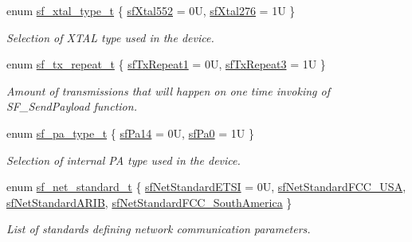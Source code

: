 \begin{DoxyCompactItemize}
enum \mbox{\hyperlink{group__sf__enum__group_ga921cd8c6964917cde98f2a132c5548d5}{sf\+\_\+xtal\+\_\+type\+\_\+t}} \{ \mbox{\hyperlink{group__sf__enum__group_gga921cd8c6964917cde98f2a132c5548d5aeec2c76936f143f22966c4e0fc3cf417}{sf\+Xtal552}} = 0U, 
\mbox{\hyperlink{group__sf__enum__group_gga921cd8c6964917cde98f2a132c5548d5a5e6adb116a9a9946e482b94bef60f46b}{sf\+Xtal276}} = 1U
 \}
\begin{DoxyCompactList}\small\item\em Selection of X\+T\+AL type used in the device. \end{DoxyCompactList}\item 
enum \mbox{\hyperlink{group__sf__enum__group_ga7d2f06984784542a95d02e422a42d9cf}{sf\+\_\+tx\+\_\+repeat\+\_\+t}} \{ \mbox{\hyperlink{group__sf__enum__group_gga7d2f06984784542a95d02e422a42d9cfa68731d8416f50490cb067b1a5fac8c49}{sf\+Tx\+Repeat1}} = 0U, 
\mbox{\hyperlink{group__sf__enum__group_gga7d2f06984784542a95d02e422a42d9cfa4da7c9c47dc49a65d23bdea3ab13ace1}{sf\+Tx\+Repeat3}} = 1U
 \}
\begin{DoxyCompactList}\small\item\em Amount of transmissions that will happen on one time invoking of S\+F\+\_\+\+Send\+Payload function. \end{DoxyCompactList}\item 
enum \mbox{\hyperlink{group__sf__enum__group_gac746e971077ef8c8dac9d26a8b47a2f9}{sf\+\_\+pa\+\_\+type\+\_\+t}} \{ \mbox{\hyperlink{group__sf__enum__group_ggac746e971077ef8c8dac9d26a8b47a2f9ae374e75084169a023bad0bff5c534a79}{sf\+Pa14}} = 0U, 
\mbox{\hyperlink{group__sf__enum__group_ggac746e971077ef8c8dac9d26a8b47a2f9a42cbf4af933c869670f191acfb3ef422}{sf\+Pa0}} = 1U
 \}
\begin{DoxyCompactList}\small\item\em Selection of internal PA type used in the device. \end{DoxyCompactList}\item 
enum \mbox{\hyperlink{group__sf__enum__group_ga9ad07e4b666d7d70f7a69614ecb89421}{sf\+\_\+net\+\_\+standard\+\_\+t}} \{ \mbox{\hyperlink{group__sf__enum__group_gga9ad07e4b666d7d70f7a69614ecb89421a8280855764dcf37f8006cc6fa9e3882b}{sf\+Net\+Standard\+E\+T\+SI}} = 0U, 
\mbox{\hyperlink{group__sf__enum__group_gga9ad07e4b666d7d70f7a69614ecb89421a0ea0f3cba82c21c5ecf607640e1f9d08}{sf\+Net\+Standard\+F\+C\+C\+\_\+\+U\+SA}}, 
\mbox{\hyperlink{group__sf__enum__group_gga9ad07e4b666d7d70f7a69614ecb89421a602fd419505a63597bf81f351623cb99}{sf\+Net\+Standard\+A\+R\+IB}}, 
\mbox{\hyperlink{group__sf__enum__group_gga9ad07e4b666d7d70f7a69614ecb89421a628eee35ad8745cb5989b1b8b82089f0}{sf\+Net\+Standard\+F\+C\+C\+\_\+\+South\+America}}
 \}
\begin{DoxyCompactList}\small\item\em List of standards defining network communication parameters. \end{DoxyCompactList}\end{DoxyCompactItemize}


